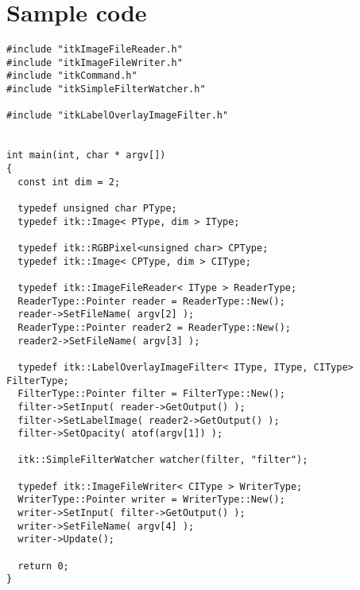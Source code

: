 \documentclass{InsightArticle}
\begin{document}
\section{Sample code}

\small \begin{verbatim}
#include "itkImageFileReader.h"
#include "itkImageFileWriter.h"
#include "itkCommand.h"
#include "itkSimpleFilterWatcher.h"

#include "itkLabelOverlayImageFilter.h"


int main(int, char * argv[])
{
  const int dim = 2;
  
  typedef unsigned char PType;
  typedef itk::Image< PType, dim > IType;

  typedef itk::RGBPixel<unsigned char> CPType;
  typedef itk::Image< CPType, dim > CIType;

  typedef itk::ImageFileReader< IType > ReaderType;
  ReaderType::Pointer reader = ReaderType::New();
  reader->SetFileName( argv[2] );
  ReaderType::Pointer reader2 = ReaderType::New();
  reader2->SetFileName( argv[3] );

  typedef itk::LabelOverlayImageFilter< IType, IType, CIType> FilterType;
  FilterType::Pointer filter = FilterType::New();
  filter->SetInput( reader->GetOutput() );
  filter->SetLabelImage( reader2->GetOutput() );
  filter->SetOpacity( atof(argv[1]) );

  itk::SimpleFilterWatcher watcher(filter, "filter");

  typedef itk::ImageFileWriter< CIType > WriterType;
  WriterType::Pointer writer = WriterType::New();
  writer->SetInput( filter->GetOutput() );
  writer->SetFileName( argv[4] );
  writer->Update();

  return 0;
}
\end{verbatim} \normalsize





\end{document}
